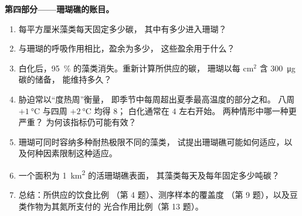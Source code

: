 \begin{problem}
\medskip
\noindent\textbf{第四部分——珊瑚礁的账目。}
\begin{enumerate}[resume]
  \item 每平方厘米藻类每天固定多少碳，
        其中有多少进入珊瑚？
  \item 与珊瑚的呼吸作用相比，盈余为多少，
        这些盈余用于什么？
  \item 白化后，\qty{95}{\%} 的藻类消失。重新计算所供应的碳，
        珊瑚以每 cm$^{2}$ 含 \qty{300}{\micro g} 碳的储备，
        能维持多久？
  \item 胁迫常以“度热周”衡量，
        即季节中每周超出夏季最高温度的部分之和。
        八周 $+\qty{1}{\celsius}$ 与四周 $+\qty{2}{\celsius}$ 均得 $8$；
        白化通常在 $4$ 左右开始。
        两种情形中哪一种更严重？
        为何该指标仍可能有效？
  \item 珊瑚可同时容纳多种耐热极限不同的藻类，
        试提出珊瑚礁可能如何适应，以及何种因素限制这种适应。
  \item 一个面积为 \qty{1}{km^2} 的活珊瑚礁表面，
        其藻类每天及每年固定多少吨碳？
  \item 总结：所供应的饮食比例
        （第 4 题）、测序样本的覆盖度
        （第 9 题），以及豆类作物为其氮所支付的
        光合作用比例（第 13 题）。
\end{enumerate}
\end{problem}
